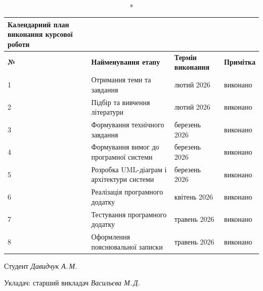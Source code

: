 \begin{longtable}{|p{1.2cm}|p{8.3cm}|p{3cm}|p{2.3cm}|}
\caption*{Календарний план виконання курсової роботи}\\
\hline
\textbf{№} & \textbf{Найменування етапу} & \textbf{Термін виконання} & \textbf{Примітка} \\
\hline
1 & Отримання теми та завдання & лютий 2026 & виконано \\
\hline
2 & Підбір та вивчення літератури & лютий 2026 & виконано \\
\hline
3 & Формування технічного завдання & березень 2026 & виконано \\
\hline
4 & Формування вимог до програмної системи & березень 2026 & виконано \\
\hline
5 & Розробка UML-діаграм і архітектури системи & березень 2026 & виконано \\
\hline
6 & Реалізація програмного додатку & квітень 2026 & виконано \\
\hline
7 & Тестування програмного додатку & травень 2026 & виконано \\
\hline
8 & Оформлення пояснювальної записки & травень 2026 & виконано \\
\hline
\end{longtable}

\vspace{1em}

\noindent Студент \hfill \textit{Давидчук А.\,М.}

\vspace{1em}

\noindent Укладач: старший викладач \hfill \textit{Васильєва М.\,Д.}
